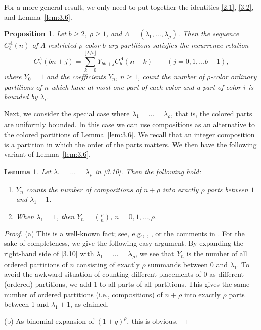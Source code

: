 \documentclass{amsart}
\theoremstyle{plain}
\newtheorem{proposition}[theorem]{Proposition}
\newtheorem{lemma}[theorem]{Lemma}
\numberwithin{equation}{section}
\begin{document}
For a more general result, we only need to put together the identities 
\eqref{2.1}, \eqref{3.2}, and Lemma~\ref{lem:3.6}.

\begin{proposition}\label{prop:3.8}
Let $b\geq 2$, $\rho\geq 1$, and $\Lambda=(\lambda_1,\ldots,\lambda_\rho)$.
Then the sequence $C_b^\Lambda(n)$ of $\Lambda$-restricted $\rho$-color 
$b$-ary partitions satisfies the recurrence relation
\begin{equation}\label{3.13}
C_b^\Lambda(bn+j)=\sum_{k=0}^{\lfloor\lambda/b\rfloor}Y_{bk+j}C_b^\Lambda(n-k)
\qquad (j=0, 1,\ldots b-1),
\end{equation}
where $Y_0=1$ and the coefficients $Y_n$, $n\geq 1$, count the number of 
$\rho$-color ordinary partitions of $n$ which have at most
one part of each color and a part of color $i$ is bounded by $\lambda_i$.
\end{proposition}

Next, we consider the special case where $\lambda_1=\dots=\lambda_\rho$, that 
is, the colored parts are uniformly bounded. In this case we can use
compositions as an alternative to the colored partitions of Lemma~\ref{lem:3.6}.
We recall that an integer composition is a partition in which the order of the
parts matters. We then have the following variant of Lemma~\ref{lem:3.6}.

\begin{lemma}\label{lem:3.9} 
Let $\lambda_1=\dots=\lambda_\rho$ in \eqref{3.10}. Then the following hold:
\begin{enumerate}
\item[(a)] $Y_n$ counts the number of compositions of $n+\rho$ into exactly 
$\rho$ parts between $1$ and $\lambda_1+1$.
\item[(b)] When $\lambda_1=1$, then $Y_n=\binom{\rho}{n}$, $n=0,1,\ldots,\rho$.
\end{enumerate}
\end{lemma} 

\begin{proof}
(a) This is a well-known fact; see, e.g., \cite{Eg}, \cite{HO}, or the 
comments in \cite[A027907 or A008287]{OEIS}. For the sake of completeness, we
give the following easy argument. By expanding the right-hand side of 
\eqref{3.10} with $\lambda_1=\dots=\lambda_\rho$, we see that $Y_n$ is the
number of all ordered partitions of $n$ consisting of exactly $\rho$ summands
between 0 and $\lambda_1$. To avoid the awkward situation of counting 
different placements of 0 as different (ordered) partitions, we add 1 to all
parts of all partitions. This gives the same number of ordered partitions
(i.e., compositions) of $n+\rho$ into exactly $\rho$ parts between 1 and
$\lambda_1+1$, as claimed. 

(b) As binomial expansion of $(1+q)^{\rho}$, this is obvious.
\end{proof}
\end{document}
